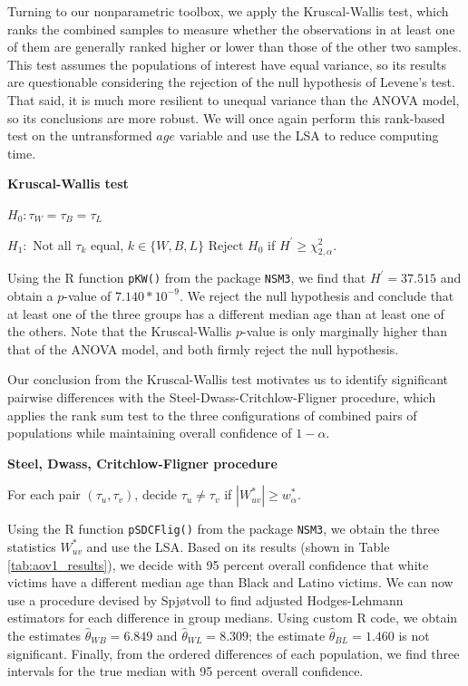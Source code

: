 \par Turning to our nonparametric toolbox, we apply the Kruscal-Wallis test, which ranks the combined samples to measure whether the observations in at least one of them are generally ranked higher or lower than those of the other two samples. This test assumes the populations of interest have equal variance, so its results are questionable considering the rejection of the null hypothesis of Levene's test. That said, it is much more resilient to unequal variance than the ANOVA model, so its conclusions are more robust. We will once again perform this rank-based test on the untransformed $age$ variable and use the LSA to reduce computing time.

\newpage

\textbf{Kruscal-Wallis test}

\bigskip $H_0: \tau_{W} = \tau_{B} = \tau_{L}$

$H_1:$ Not all $\tau_k$ equal, $k \in \{W,B,L\}$ \hspace{.5in} Reject $H_0$ if $H^{\prime} \ge \chi^2_{2,\alpha}$.

\par \bigskip Using the R function \texttt{pKW()} from the package \texttt{NSM3}, we find that $H^{\prime} = 37.515$ and obtain a $p$-value of $7.140*10^{-9}$. We reject the null hypothesis and conclude that at least one of the three groups has a different median age than at least one of the others. Note that the Kruscal-Wallis $p$-value is only marginally higher than that of the ANOVA model, and both firmly reject the null hypothesis.

\par \bigskip Our conclusion from the Kruscal-Wallis test motivates us to identify significant pairwise differences with the Steel-Dwass-Critchlow-Fligner procedure, which applies the rank sum test to the three configurations of combined pairs of populations while maintaining overall confidence of $1-\alpha$.

\bigskip \textbf{Steel, Dwass, Critchlow-Fligner procedure}

\bigskip For each pair $(\tau_u,\tau_v)$, decide $\tau_u \not= \tau_v$ if $|W^*_{uv}| \ge w^*_{\alpha}$.

\par \bigskip Using the R function \texttt{pSDCFlig()} from the package \texttt{NSM3}, we obtain the three statistics $W^*_{uv}$ and use the LSA. Based on its results (shown in Table \ref{tab:aov1_results}), we decide with 95 percent overall confidence that white victims have a different median age than Black and Latino victims. We can now use a procedure devised by Spjøtvoll to find adjusted Hodges-Lehmann estimators for each difference in group medians. Using custom R code, we obtain the estimates $\hat{\theta}_{WB} = 6.849$ and $\hat{\theta}_{WL} = 8.309$; the estimate $\hat{\theta}_{BL} = 1.460$ is not significant. Finally, from the ordered differences of each population, we find three intervals for the true median with 95 percent overall confidence.

